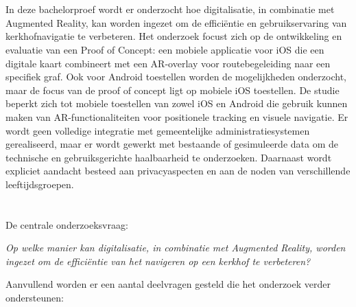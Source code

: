 \section{}%
\label{sec:onderzoeksdoelstelling}

In deze bachelorproef wordt er onderzocht hoe digitalisatie, in combinatie met Augmented Reality, kan worden ingezet om de efficiëntie en gebruikservaring van kerkhofnavigatie te verbeteren. Het onderzoek focust zich op de ontwikkeling en evaluatie van een Proof of Concept: een mobiele applicatie voor iOS die een digitale kaart combineert met een AR-overlay voor routebegeleiding naar een specifiek graf. Ook voor Android toestellen worden de mogelijkheden onderzocht, maar de focus van de proof of concept ligt op mobiele iOS toestellen. De studie beperkt zich tot mobiele toestellen van zowel iOS en Android die gebruik kunnen maken van AR-functionaliteiten voor positionele tracking en visuele navigatie. Er wordt geen volledige integratie met gemeentelijke administratiesystemen gerealiseerd, maar er wordt gewerkt met bestaande of gesimuleerde data om de technische en gebruiksgerichte haalbaarheid te onderzoeken. Daarnaast wordt expliciet aandacht besteed aan privacyaspecten en aan de noden van verschillende leeftijdsgroepen.


\section{}%
\label{sec:onderzoeksvraag}

De centrale onderzoeksvraag:

\begin{center}
    \vfill
    \textit{Op welke manier kan digitalisatie, in combinatie met Augmented Reality, worden ingezet om de efficiëntie van het navigeren op een kerkhof te verbeteren?}
    \vfill
\end{center}

\vspace{0.5cm}

Aanvullend worden er een aantal deelvragen gesteld die het onderzoek verder ondersteunen:

